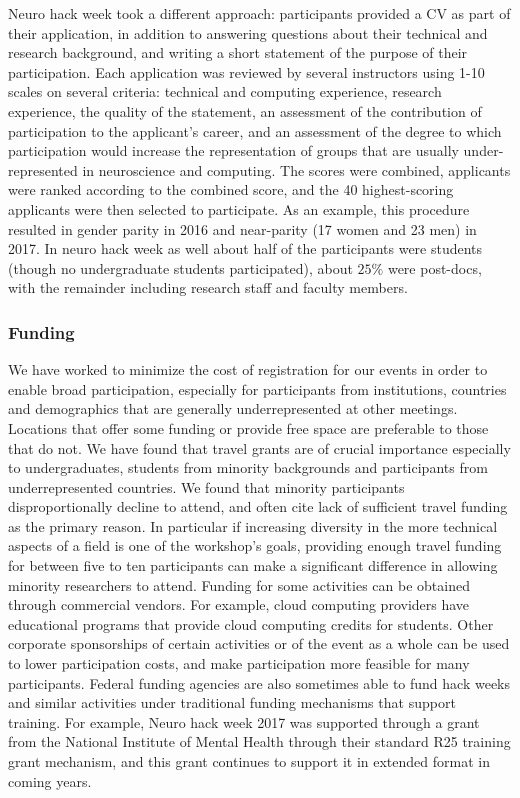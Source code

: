 \documentclass{aastex62}
\begin{document}
Neuro hack week took a different approach: participants provided a CV as part of their application, in addition to answering questions about their technical and research background, and writing a short statement of the purpose of their participation. Each application was reviewed by several instructors using 1-10 scales on several criteria: technical and computing experience, research experience, the quality of the statement, an assessment of the contribution of participation to the applicant's career, and an assessment of the degree to which participation would increase the representation of groups that are usually under-represented in neuroscience and computing. The scores were combined, applicants were ranked according to the combined score, and the 40 highest-scoring applicants were then selected to participate. As an example,  this procedure resulted in gender parity in 2016 and near-parity (17 women and 23 men) in 2017. In neuro hack week as well about half of the participants were students (though no undergraduate students participated), about $25\%$ were post-docs, with the remainder including research staff and faculty members.

\subsubsection{Funding}

We have worked to minimize the cost of registration for our events in order to enable broad participation, especially for participants from institutions, countries and demographics that are generally underrepresented at other meetings. Locations that offer some funding or provide free space are preferable to those that do not.
We have found that travel grants are of crucial importance especially to undergraduates, students from minority backgrounds and participants from underrepresented countries. We found that minority participants disproportionally decline to attend, and often cite lack of sufficient travel funding as the primary reason. In particular if increasing diversity in the more technical aspects of a field is one of the workshop's goals, providing enough travel funding for between five to ten participants can make a significant difference in allowing minority researchers to attend.
Funding for some activities can be obtained through commercial vendors.
For example, cloud computing providers have educational programs that provide cloud computing credits for students.
Other corporate sponsorships of certain activities or of the event as a whole can be used to lower participation costs, and make participation more feasible for many participants.
Federal funding agencies are also sometimes able to fund hack weeks and similar activities under traditional funding mechanisms that support training. For example, Neuro hack week 2017 was supported through a grant from the National Institute of Mental Health through their standard R25 training grant mechanism, and this grant continues to support it in extended format in coming years.
\end{document}
